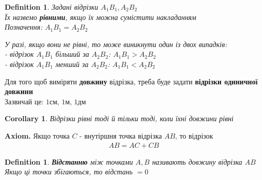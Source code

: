 \documentclass[a4paper, 14pt]{extarticle}
\theoremstyle{theoremdd}
\theoremstyle{theoremdd}
\newtheorem{definition}[theorem]{Definition}
\theoremstyle{theoremdd}
\theoremstyle{theoremdd}
\theoremstyle{theoremdd}
\theoremstyle{theoremdd}
\theoremstyle{theoremdd}
\theoremstyle{theoremdd}
\newtheorem{corollary}[theorem]{Corollary}
\begin{document}
\begin{definition}
Задані відрізки $A_1B_1, A_2B_2$\\
Їх назвемо \textbf{рівними}, якщо їх можна сумістити накладанням\\
Позначення: $A_1B_1 = A_2B_2$
\begin{figure}[H]
\centering
{}
\end{figure}
У разі, якщо вони не рівні, то може виникнути один із двох випадків:\\
- відрізок $A_1B_1$ більший за $A_2B_2$: $A_1B_1 > A_2B_2$\\
- відрізок $A_1B_1$ менший за $A_2B_2$: $A_1B_1 < A_2B_2$
\end{definition}
Для того щоб виміряти \textbf{довжину} відрізка, треба буде задати \textbf{відрізки одиничної довжини}\\
Зазвичай це: $1$см, $1$м, $1$дм

\begin{corollary}
Відрізки рівні тоді й тільки тоді, коли їхні довжини рівні
\end{corollary}

\textbf{Axiom.} Якщо точка $C$ - внутіршня точка відрізка $AB$, то відрізок
\begin{align*}
AB = AC + CB
\end{align*}
\begin{figure}[H]
\centering
{}
\end{figure}

\begin{definition}
\textbf{Відстанню} між точками $A,B$ називають довжину відрізка $AB$\\
Якщо ці точки збігаються, то відстань $= 0$
\end{definition}
\end{document}
